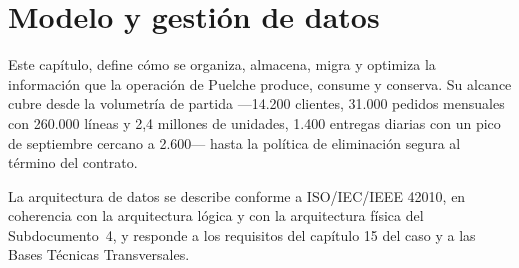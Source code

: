 
\setcounter{chapter}{4}
\chapter{Modelo y gestión de datos}
\label{cap:datos}


Este capítulo, define cómo se organiza, almacena, migra y optimiza la
información que la operación de Puelche produce, consume y conserva.  Su
alcance cubre desde la volumetría de partida ---14.200 clientes, 31.000
pedidos mensuales con 260.000 líneas y 2,4 millones de unidades, 1.400
entregas diarias con un pico de septiembre cercano a 2.600--- hasta la
política de eliminación segura al término del contrato.

La arquitectura de datos se describe conforme a ISO/IEC/IEEE 42010, en
coherencia con la arquitectura lógica y con la arquitectura física del
Subdocumento~4, y responde a los requisitos del capítulo 15 del caso y a las
Bases Técnicas Transversales.

